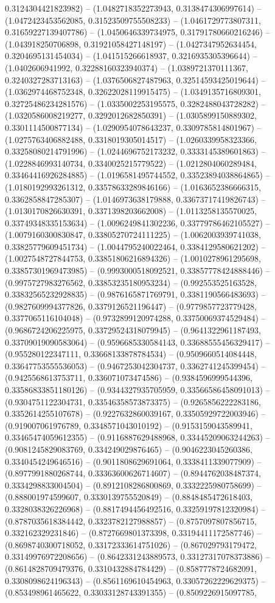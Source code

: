 0.3124304421823982) -- (1.0482718352273943, 0.3138474306997614) -- (1.0472423453562085, 0.31523509755508233) -- (1.0461729773807311, 0.31659227139407786) -- (1.0450646339734975, 0.31791780660216246) -- (1.043918250706898, 0.31921058427148197) -- (1.0427347952634454, 0.3204695131454034) -- (1.041515266618937, 0.3216935305396644) -- (1.0402606941992, 0.32288160323940374) -- (1.0389721370111367, 0.3240327283713163) -- (1.0376506827487963, 0.32514593425019644) -- (1.0362974468752348, 0.32622028119915475) -- (1.0349135716809301, 0.32725486234281576) -- (1.0335002253195575, 0.3282488043728282) -- (1.0320586008219277, 0.3292012682850391) -- (1.0305899150889302, 0.3301114500877134) -- (1.0290954078643237, 0.3309785814801967) -- (1.0275763406882488, 0.3318019305014517) -- (1.0260339958323366, 0.33258080214791996) -- (1.0244696752173232, 0.3333145389601863) -- (1.0228846993140734, 0.3340025215779522) -- (1.0212804060289484, 0.33464416926284885) -- (1.0196581495744552, 0.33523894038864865) -- (1.0180192993261312, 0.33578633289846166) -- (1.0163652386666315, 0.3362858847285307) -- (1.0146973638179888, 0.33673717419826743) -- (1.0130170826630391, 0.3371398203662008) -- (1.0113258135570025, 0.33749348335153634) -- (1.0096249841302236, 0.33779786462105527) -- (1.0079160300830847, 0.33805270724111225) -- (1.0062003939741038, 0.33825779609451734) -- (1.0044795240022464, 0.3384129580621202) -- (1.0027548727844753, 0.33851806216894326) -- (1.0010278961295698, 0.33857301969473985) -- (0.9993000518092521, 0.33857778424888446) -- (0.9975727983276562, 0.33853235180953234) -- (0.992553525163528, 0.33832565232928835) -- (0.9876165871769791, 0.3381190566483693) -- (0.9827609994377826, 0.3379126521196447) -- (0.9779857723779428, 0.3377065116104048) -- (0.9732899120974288, 0.33750069374529484) -- (0.9686724206225975, 0.33729524318079945) -- (0.9641322961187493, 0.33709019090583064) -- (0.9596685330584143, 0.33688555456329417) -- (0.955280122347111, 0.33668133878784534) -- (0.9509660514084448, 0.33647753555536053) -- (0.9467253042304737, 0.3362741245399454) -- (0.9425568613753711, 0.336071073474586) -- (0.9384596999544396, 0.33586833851180126) -- (0.9344327935705959, 0.33566586458091013) -- (0.9304751122304731, 0.33546358573873375) -- (0.9265856222283186, 0.3352614255107678) -- (0.9227632860039167, 0.33505929722003946) -- (0.919007061976789, 0.3348571043010192) -- (0.9153159043589941, 0.33465474059612355) -- (0.9116887629488968, 0.33445209063244263) -- (0.9081245829083769, 0.334249029876465) -- (0.9046223045260386, 0.3340454249646516) -- (0.9011808629691064, 0.3338411339077909) -- (0.8977991880268744, 0.33363600626714607) -- (0.8944762038487374, 0.3334298833004504) -- (0.8912108286800869, 0.3332225980758699) -- (0.888001974599607, 0.3330139755520849) -- (0.8848485472618403, 0.3328038326226968) -- (0.8817494456492516, 0.33259197812320984) -- (0.8787035618384442, 0.3323782127988857) -- (0.8757097807856715, 0.332162329231846) -- (0.8727669801373398, 0.33194411172587746) -- (0.8698740300718052, 0.33172333614751026) -- (0.867029793179472, 0.33149976972208656) -- (0.8642331243889573, 0.33127317078373886) -- (0.8614828709479376, 0.3310432884784429) -- (0.8587778724682091, 0.3308098624196343) -- (0.8561169610454963, 0.33057262229629375) -- (0.853498961465622, 0.33033128743391355) -- (0.8509226915097785, 